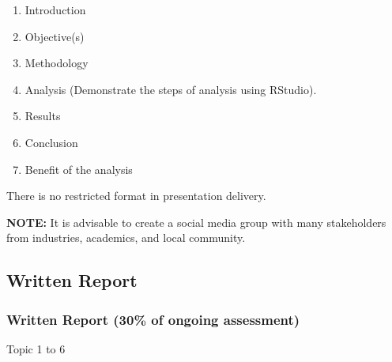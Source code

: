 \documentclass[
]{article}
\providecommand{\tightlist}{%
  \setlength{\itemsep}{0pt}\setlength{\parskip}{0pt}}
\begin{document}
\begin{enumerate}
\def\labelenumi{\arabic{enumi})}
\tightlist
\item
  Introduction
\item
  Objective(s)
\item
  Methodology
\item
  Analysis (Demonstrate the steps of analysis using RStudio).
\item
  Results
\item
  Conclusion
\item
  Benefit of the analysis
\end{enumerate}

There is no restricted format in presentation delivery.

\textbf{NOTE:} It is advisable to create a social media group with many
stakeholders from industries, academics, and local community.

\hypertarget{written-report}{%
\subsection{Written Report}\label{written-report}}

\hypertarget{written-report-30-of-ongoing-assessment}{%
\subsubsection{Written Report (30\% of ongoing
assessment)}\label{written-report-30-of-ongoing-assessment}}

Topic 1 to 6
\end{document}

